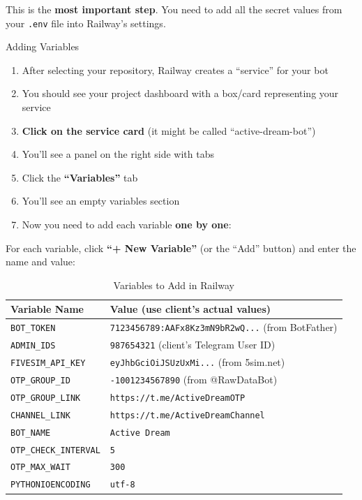 This is the \textbf{most important step}. You need to add all the secret values from your \texttt{.env} file into Railway's settings.

\begin{stepbox}{Adding Variables}
\begin{enumerate}[leftmargin=1.5cm]
    \item After selecting your repository, Railway creates a ``service'' for your bot
    \item You should see your project dashboard with a box/card representing your service
    \item \textbf{Click on the service card} (it might be called ``active-dream-bot'')
    \item You'll see a panel on the right side with tabs
    \item Click the \textbf{``Variables''} tab
    \item You'll see an empty variables section
    \item Now you need to add each variable \textbf{one by one}:
\end{enumerate}
\end{stepbox}

For each variable, click \textbf{``+ New Variable''} (or the ``Add'' button) and enter the name and value:

\begin{table}[H]
\centering
\caption{Variables to Add in Railway}
\begin{tabularx}{\textwidth}{|l|X|}
\hline
\textbf{Variable Name} & \textbf{Value (use client's actual values)} \\
\hline
\texttt{BOT\_TOKEN} & \texttt{7123456789:AAFx8Kz3mN9bR2wQ...} (from BotFather) \\
\hline
\texttt{ADMIN\_IDS} & \texttt{987654321} (client's Telegram User ID) \\
\hline
\texttt{FIVESIM\_API\_KEY} & \texttt{eyJhbGciOiJSUzUxMi...} (from 5sim.net) \\
\hline
\texttt{OTP\_GROUP\_ID} & \texttt{-1001234567890} (from @RawDataBot) \\
\hline
\texttt{OTP\_GROUP\_LINK} & \texttt{https://t.me/ActiveDreamOTP} \\
\hline
\texttt{CHANNEL\_LINK} & \texttt{https://t.me/ActiveDreamChannel} \\
\hline
\texttt{BOT\_NAME} & \texttt{Active Dream} \\
\hline
\texttt{OTP\_CHECK\_INTERVAL} & \texttt{5} \\
\hline
\texttt{OTP\_MAX\_WAIT} & \texttt{300} \\
\hline
\texttt{PYTHONIOENCODING} & \texttt{utf-8} \\
\hline
\end{tabularx}
\end{table}

